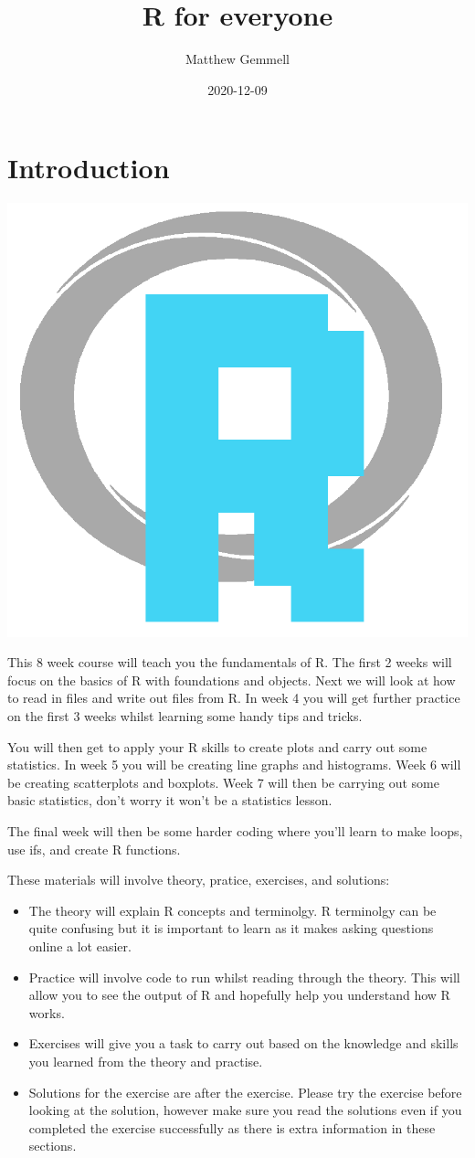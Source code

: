 \documentclass[]{book}
\title{R for everyone}
\author{Matthew Gemmell}
\date{2020-12-09}
\providecommand{\tightlist}{%
  \setlength{\itemsep}{0pt}\setlength{\parskip}{0pt}}
\begin{document}
\maketitle

{
\setcounter{tocdepth}{1}
\tableofcontents
}
\chapter{Introduction}\label{introduction}

\begin{center}\includegraphics[width=0.2\linewidth]{figures/R} \end{center}

This 8 week course will teach you the fundamentals of R. The first 2
weeks will focus on the basics of R with foundations and objects. Next
we will look at how to read in files and write out files from R. In week
4 you will get further practice on the first 3 weeks whilst learning
some handy tips and tricks.

You will then get to apply your R skills to create plots and carry out
some statistics. In week 5 you will be creating line graphs and
histograms. Week 6 will be creating scatterplots and boxplots. Week 7
will then be carrying out some basic statistics, don't worry it won't be
a statistics lesson.

The final week will then be some harder coding where you'll learn to
make loops, use ifs, and create R functions.

These materials will involve theory, pratice, exercises, and solutions:

\begin{itemize}
\tightlist
\item
  The theory will explain R concepts and terminolgy. R terminolgy can be
  quite confusing but it is important to learn as it makes asking
  questions online a lot easier.
\item
  Practice will involve code to run whilst reading through the theory.
  This will allow you to see the output of R and hopefully help you
  understand how R works.
\item
  Exercises will give you a task to carry out based on the knowledge and
  skills you learned from the theory and practise.
\item
  Solutions for the exercise are after the exercise. Please try the
  exercise before looking at the solution, however make sure you read
  the solutions even if you completed the exercise successfully as there
  is extra information in these sections.
\end{itemize}
\end{document}

